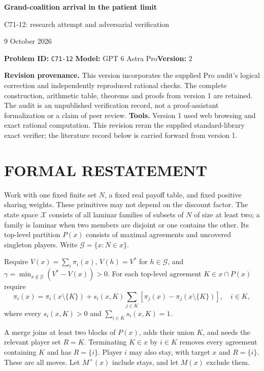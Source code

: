 \documentclass[11pt,a4paper]{article}
\theoremstyle{definition}\newtheorem{definition}[theorem]{Definition}
\theoremstyle{remark}\newtheorem{remark}[theorem]{Remark}
\newcommand{\1}{\mathbf 1}
\begin{document}
\begin{center}
{\Large\bfseries Grand-coalition arrival in the patient limit}\par
\medskip
{\large C71-12: research attempt and adversarial verification}\par
9 October 2026
\end{center}
\noindent\textbf{Problem ID:} \texttt{C71-12}\quad
\textbf{Model:} GPT 6 Astra Pro\quad\textbf{Version:} 2\par
\textbf{Revision provenance.} This version incorporates the supplied Pro
audit's logical correction and independently reproduced rational checks.
The complete construction, arithmetic table, theorems and proofs from
version 1 are retained. The audit is an unpublished verification record,
not a proof-assistant formalization or a claim of peer review.
\textbf{Tools.} Version 1 used web browsing and exact rational computation. This revision reran the supplied standard-library exact verifier; the literature record below is carried forward from version 1.\par
\section{FORMAL RESTATEMENT}
Work with one fixed finite set $N$, a fixed real payoff table, and fixed positive sharing weights. These primitives may not depend on the discount factor. The state space $\mathcal X$ consists of all laminar families of subsets of $N$ of size at least two; a family is laminar when two members are disjoint or one contains the other. Its top-level partition $P(x)$ consists of maximal agreements and uncovered singleton players. Write $\mathcal G=\{x:N\in x\}$.

Require $V(x)=\sum_i\pi_i(x)$, $V(h)=V^*$ for $h\in\mathcal G$, and
$\gamma=\min_{x\notin\mathcal G}(V^*-V(x))>0$. For each top-level agreement $K\in x\cap P(x)$ require
\[
 \pi_i(x)=\pi_i(x\setminus\{K\})+s_i(x,K)
 \sum_{j\in K}[\pi_j(x)-\pi_j(x\setminus\{K\})],\quad i\in K,
\]
where every $s_i(x,K)>0$ and $\sum_{i\in K}s_i(x,K)=1$.

A merge joins at least two blocks of $P(x)$, adds their union $K$, and needs the relevant player set $R=K$. Terminating $K\in x$ by $i\in K$ removes every agreement containing $K$ and has $R=\{i\}$. Player $i$ may also stay, with target $x$ and $R=\{i\}$. These are all moves. Let $M^+(x)$ include stays, and let $M(x)$ exclude them.
\end{document}
